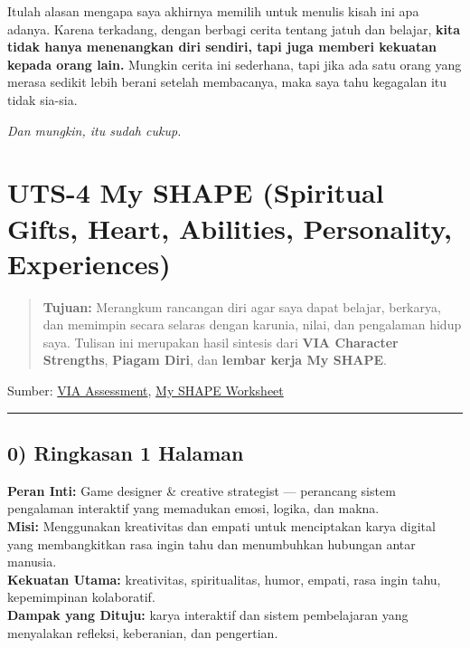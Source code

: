 \documentclass[
  letterpaper,
  DIV=11,
  numbers=noendperiod]{scrreprt}
\begin{document}
Itulah alasan mengapa saya akhirnya memilih untuk menulis kisah ini apa
adanya. Karena terkadang, dengan berbagi cerita tentang jatuh dan
belajar, \textbf{kita tidak hanya menenangkan diri sendiri, tapi juga
memberi kekuatan kepada orang lain.} Mungkin cerita ini sederhana, tapi
jika ada satu orang yang merasa sedikit lebih berani setelah membacanya,
maka saya tahu kegagalan itu tidak sia-sia.

\emph{Dan mungkin, itu sudah cukup.}


\chapter{UTS-4 My SHAPE (Spiritual Gifts, Heart, Abilities, Personality,
Experiences)}\label{uts-4-my-shape-spiritual-gifts-heart-abilities-personality-experiences}

\begin{quote}
\textbf{Tujuan:} Merangkum rancangan diri agar saya dapat belajar,
berkarya, dan memimpin secara selaras dengan karunia, nilai, dan
pengalaman hidup saya. Tulisan ini merupakan hasil sintesis dari
\textbf{VIA Character Strengths}, \textbf{Piagam Diri}, dan
\textbf{lembar kerja My SHAPE}.
\end{quote}

Sumber: \href{StrengthsProfile-Armein-Langi.pdf}{VIA Assessment},
\href{my_shape_short_2.pdf}{My SHAPE Worksheet}

\begin{center}\rule{0.5\linewidth}{0.5pt}\end{center}

\section{0) Ringkasan 1 Halaman}\label{ringkasan-1-halaman}

\textbf{Peran Inti:} Game designer \& creative strategist --- perancang
sistem pengalaman interaktif yang memadukan emosi, logika, dan makna.\\
\textbf{Misi:} Menggunakan kreativitas dan empati untuk menciptakan
karya digital yang membangkitkan rasa ingin tahu dan menumbuhkan
hubungan antar manusia.\\
\textbf{Kekuatan Utama:} kreativitas, spiritualitas, humor, empati, rasa
ingin tahu, kepemimpinan kolaboratif.\\
\textbf{Dampak yang Dituju:} karya interaktif dan sistem pembelajaran
yang menyalakan refleksi, keberanian, dan pengertian.
\end{document}
